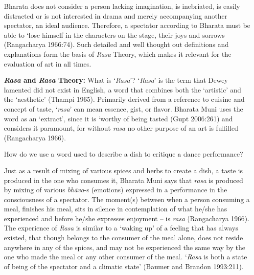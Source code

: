 Bharata does not consider a person lacking imagination, is inebriated, is easily distracted or is not interested in drama and merely accompanying another spectator, an ideal audience. Therefore, a spectator according to Bharata must be able to ‘lose himself in the characters on the stage, their joys and sorrows (Rangacharya 1966:74). Such detailed and well thought out definitions and explanations form the basis of \textsl{Rasa} Theory, which makes it relevant for the evaluation of art in all times. 

\textbf{\textsl{Rasa} and \textsl{Rasa} Theory:} What is ‘\textsl{Rasa}'?
 ‘\textsl{Rasa}’ is the term that Dewey lamented did not exist in English, a word that combines both the ‘artistic’ and the ‘aesthetic’ (Thampi 1965). Primarily derived from a reference to cuisine and concept of taste, ‘\textsl{rasa}' can mean essence, gist, or flavor. Bharata Muni uses the word as an ‘extract’, since it is ‘worthy of being tasted (Gupt 2006:261) and considers it paramount, for without \textsl{rasa} no other purpose of an art is fulfilled (Rangacharya 1966).  

How do we use a word used to describe a dish to critique a dance performance? 

Just as a result of mixing of various spices and herbs to create a dish, a taste is produced in the one who consumes it, Bharata Muni says that \textsl{rasa} is produced by mixing of various \textsl{bhāva}-s (emotions) expressed in a performance in the consciousness of a spectator. The moment(s) between when a person consuming a meal, finishes his meal, sits in silence in contemplation of what he/she has experienced and before he/she expresses enjoyment -- is \textsl{rasa} (Rangacharya 1966). The experience of \textsl{Rasa} is similar to a ‘waking up’ of a feeling that has always existed, that though belongs to the consumer of the meal alone, does not reside anywhere in any of the spices, and may not be experienced the same way by the one who made the meal or any other consumer of the meal. ‘\textsl{Rasa} is both a state of being of the spectator and a climatic state’ (Baumer and Brandon 1993:211).

